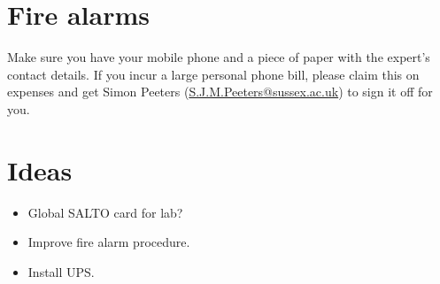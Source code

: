 \documentclass[12pt, oneside, a4paper]{article}
\begin{document}
\section{Fire alarms}
Make sure you have your mobile phone and a piece of paper with the expert's contact details. If you incur a large personal phone bill, please claim this on expenses and get Simon Peeters (\href{mailto:S.J.M.Peeters@sussex.ac.uk}{S.J.M.Peeters@sussex.ac.uk}) to sign it off for you.

\section{Ideas}
\begin{itemize}
	\item Global SALTO card for lab?
	\item Improve fire alarm procedure.
	\item Install UPS.
\end{itemize}
\end{document}
